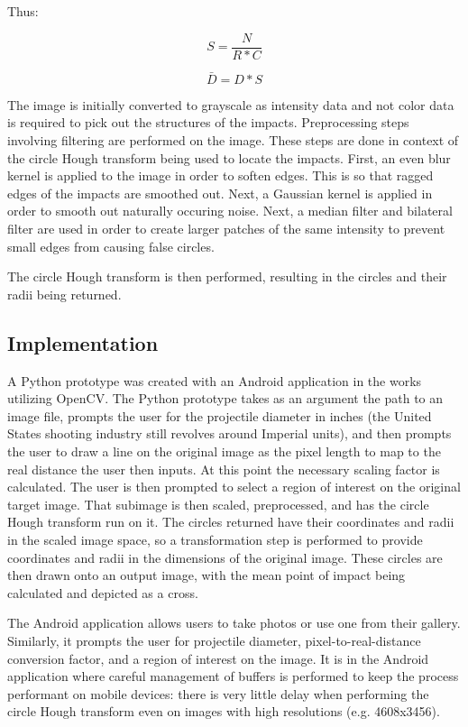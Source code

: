 \documentclass{article}
\begin{document}
Thus:

\[S = \frac{N}{R * C}\]

\[\bar{D} = D * S\]

The image is initially converted to grayscale as intensity data and not color data is required
to pick out the structures of the impacts.
Preprocessing steps involving filtering are performed on the image. These steps are done
in context of the circle Hough transform being used to locate the impacts.
First, an even blur kernel is applied to the image in order to soften edges. This is so that
ragged edges of the impacts are smoothed out. Next, a Gaussian kernel is applied in order
to smooth out naturally occuring noise. Next, a median filter and bilateral filter are used in order
to create larger patches of the same intensity to prevent small edges from causing false circles.

The circle Hough transform is then performed, resulting in the circles and their radii being returned.

\subsection{Implementation}
\label{ssec:implementation}

A Python prototype was created with an Android application in the works utilizing OpenCV.
The Python prototype takes as an argument the path to an image file, prompts
the user for the projectile diameter in inches (the United States shooting industry
still revolves around Imperial units), and then prompts the user to draw a line
on the original image as the pixel length to map to the real distance the user then inputs.
At this point the necessary scaling factor is calculated.
The user is then prompted to select a region of interest on the original target image.
That subimage is then scaled, preprocessed, and has the circle Hough transform run on it.
The circles returned have their coordinates and radii in the scaled image space, so a
transformation step is performed to provide coordinates and radii in the dimensions of
the original image. These circles are then drawn onto an output image, with the mean
point of impact being calculated and depicted as a cross.

The Android application allows users to take photos or use one from their gallery. Similarly,
it prompts the user for projectile diameter, pixel-to-real-distance conversion factor, and
a region of interest on the image. It is in the Android application where careful management
of buffers is performed to keep the process performant on mobile devices:
there is very little delay when performing the circle Hough transform even on
images with high resolutions (e.g. 4608x3456).
\end{document}
